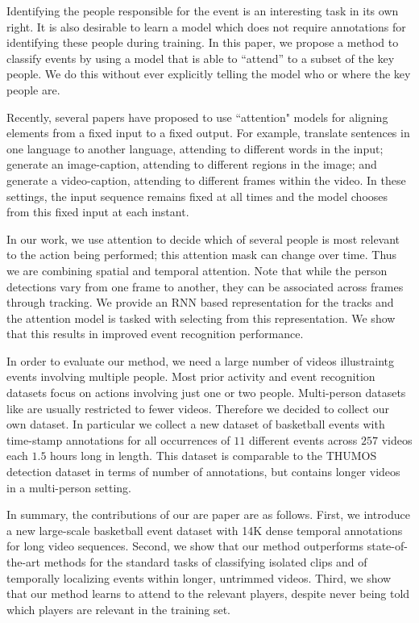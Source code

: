 Identifying the people responsible for the event is an interesting task in its
own right.  It is also desirable to learn a model which does not require
annotations for identifying these people during training.  In
this paper, we propose a method  to classify events by using a model that is
able to ``attend'' to a subset of the key people.  We  do this without ever
explicitly telling the model who or where the key people are.

Recently, several papers have proposed to use ``attention" models for aligning
elements from a fixed input to a fixed output.  For example,
\cite{Bahdnau_arxiv14} translate sentences in one language to another language,
attending to different words in the input; \cite{Xu_arxiv15} generate an image-caption,
attending to different regions in the image; and
\cite{Yao_arxiv15} generate a video-caption, attending to different
frames within the video.  In these settings, the input sequence remains fixed
at all times and the model chooses from this fixed input at each instant.

In our work, we use attention to decide which of several people is most
relevant to the action being performed; this attention mask can change over
time. Thus we are combining spatial and temporal attention.  Note that while
the person detections vary from one frame to another, they can be associated
across frames through tracking. We provide an RNN based representation for the
tracks and the attention model is tasked with selecting from this
representation. We show that this results in improved event recognition
performance.

In order to evaluate our method, we need a large number of videos illustraintg
events involving multiple people. Most prior activity and event
recognition datasets focus on actions involving just one or two people.
Multi-person datasets like \cite{Ryoo_ICCV09,VIRAT,Choi_ICCV09} are usually restricted to fewer videos.
Therefore we decided to collect our own dataset.
In particular we collect a new dataset of basketball events with time-stamp annotations for
all occurrences of $11$ different events across $257$ videos each $1.5$ hours
long in length.  This dataset is comparable to the THUMOS \cite{THUMOS}
detection dataset in terms of number of annotations, but contains longer videos
in a multi-person setting.

In summary, the contributions of our are paper are as follows.  First, we
introduce a new  large-scale basketball event dataset with 14K dense temporal
annotations for long video sequences.  Second, we show that our method
outperforms state-of-the-art methods for the standard tasks of classifying
isolated clips and of temporally localizing events within longer, untrimmed
videos.  Third, we show that our method learns to attend to the relevant
players, despite never being told which players are relevant in the training
set.
